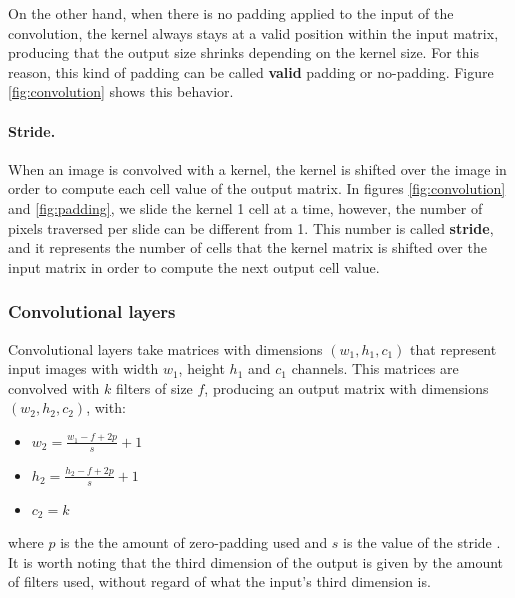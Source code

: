 On the other hand, when there is no padding applied to the input of the convolution, the kernel always stays at a valid position within the input matrix, producing that the output size shrinks depending on the kernel size. For this reason, this kind of padding can be called \textbf{valid} padding or no-padding. Figure \ref{fig:convolution} shows this behavior.

\paragraph{Stride.}
When an image is convolved with a kernel, the kernel is shifted over the image in order to compute each cell value of the output matrix. In figures \ref{fig:convolution} and \ref{fig:padding}, we slide the kernel 1 cell at a time, however, the number of pixels traversed per slide can be different from 1. This number is called \textbf{stride}, and it represents the number of cells that the kernel matrix is shifted over the input matrix in order to compute the next output cell value.

\subsubsection*{Convolutional layers}
Convolutional layers take matrices with dimensions $(w_1, h_1, c_1)$ that represent input images with width $w_1$, height $h_1$ and $c_1$ channels. This matrices are convolved with $k$ filters of size $f$, producing an output matrix with dimensions $(w_2, h_2, c_2)$, with:

\begin{itemize}
	\item $w_2 = \frac{w_1 - f + 2p}{s} + 1$
	\item $h_2 = \frac{h_2 - f + 2p}{s} + 1$
	\item $c_2 = k$
\end{itemize}
where $p$ is the the amount of zero-padding used and $s$ is the value of the stride \cite{STANFORD}. It is worth noting that the third dimension of the output is given by the amount of filters used, without regard of what the input's third dimension is.

